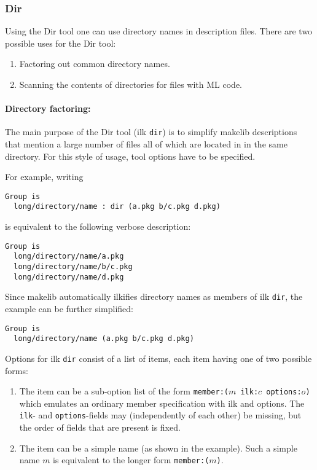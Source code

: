 \subsubsection{Dir}
\label{sec:builtin-tools:dir}

Using the Dir tool one can use directory names in description files.
There are two possible uses for the Dir tool:

\begin{enumerate}
\item Factoring out common directory names.
\item Scanning the contents of directories for files with ML code.
\end{enumerate}

\paragraph{Directory factoring:}
The main purpose of the Dir tool (ilk {\tt dir}) is to simplify makelib
descriptions that mention a large number of files all of which are
located in in the same directory.  For this style of usage, tool
options have to be specified.

For example, writing

\begin{verbatim}
Group is
  long/directory/name : dir (a.pkg b/c.pkg d.pkg)
\end{verbatim}

is equivalent to the following verbose description:

\begin{verbatim}
Group is
  long/directory/name/a.pkg
  long/directory/name/b/c.pkg
  long/directory/name/d.pkg
\end{verbatim}

Since makelib automatically ilkifies directory names as members of ilk
{\tt dir}, the example can be further simplified:

\begin{verbatim}
Group is
  long/directory/name (a.pkg b/c.pkg d.pkg)
\end{verbatim}

Options for ilk {\tt dir} consist of a list of items, each item
having one of two possible forms:

\begin{enumerate}
\item The item can be a sub-option list of the form
{\tt member:($m$ ilk:$c$ options:$o$)} which emulates an ordinary
member specification with ilk and options.  The {\tt ilk}- and
{\tt options}-fields may (independently of each other) be missing, but
the order of fields that are present is fixed.
\item The item can be a simple name (as shown in the example).  Such a
simple name $m$ is equivalent to the longer form {\tt member:($m$)}.
\end{enumerate}

